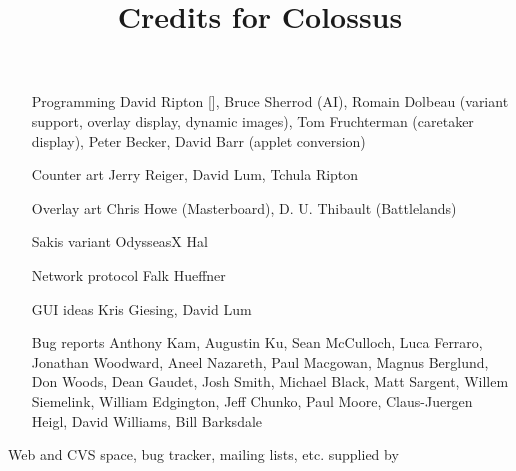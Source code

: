 \documentclass{article}
\begin{document}

\title{Credits for Colossus}

\maketitle

\begin{itemize}

\item[Programming] David Ripton [], Bruce Sherrod (AI), Romain Dolbeau (variant support, overlay display, dynamic images), Tom Fruchterman (caretaker display), Peter Becker, David Barr (applet conversion)

\item[Counter art] Jerry Reiger, David Lum, Tchula Ripton

\item[Overlay art] Chris Howe (Masterboard), D. U. Thibault (Battlelands)

\item[Sakis variant] OdysseasX Hal

\item[Network protocol] Falk Hueffner

\item[GUI ideas] Kris Giesing, David Lum

\item[Bug reports] Anthony Kam, Augustin Ku, Sean McCulloch, Luca Ferraro, Jonathan Woodward, Aneel Nazareth, Paul Macgowan, Magnus Berglund, Don Woods, Dean Gaudet, Josh Smith, Michael Black, Matt Sargent, Willem Siemelink, William Edgington, Jeff Chunko, Paul Moore, Claus-Juergen Heigl, David Williams, Bill Barksdale

\end{itemize}

Web and CVS space, bug tracker, mailing lists, etc. supplied by 
\end{document}
